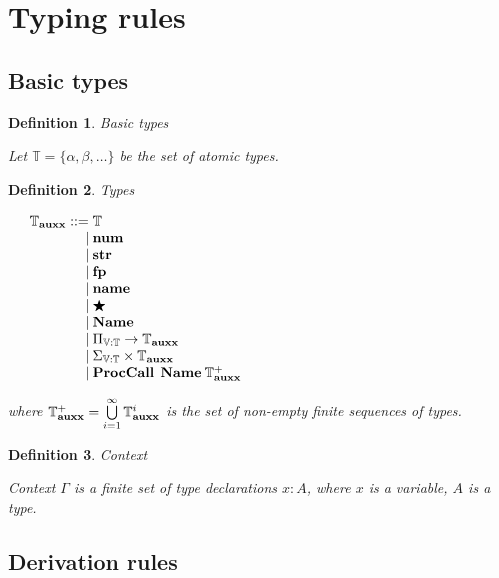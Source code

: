 \documentclass[a4paper]{article}
\newtheorem{defin}{Definition}
\begin{document}
\section{Typing rules}

\subsection{Basic types}

\begin{defin} Basic types

Let $\mathbb{T} = \{ \alpha, \beta, \dots \}$ be the set of atomic types.

\end{defin}

\begin{defin} Types

$\begin{array}{lll}
&\mathbb{T}_{\bf auxx} ::= \mathbb{T}&\\
&\quad\quad\quad\quad | \: {\bf num} &\\
&\quad\quad\quad\quad | \: {\bf str} &\\
&\quad\quad\quad\quad | \: {\bf fp} &\\
&\quad\quad\quad\quad | \: {\bf name} &\\
&\quad\quad\quad\quad | \: \bigstar &\\
&\quad\quad\quad\quad | \: {\bf Name} &\\
&\quad\quad\quad\quad | \: \Pi_{\mathbb{V} : \mathbb{T}} \to \mathbb{T}_{\bf auxx}& \\
&\quad\quad\quad\quad | \: \Sigma_{\mathbb{V} : \mathbb{T}} \times \mathbb{T}_{\bf auxx}& \\
&\quad\quad\quad\quad | \: {\bf ProcCall \:} \: {\bf Name} \: \mathbb{T}_{\bf auxx}^{+}&
\end{array}$

where $\mathbb{T}_{\bf auxx}^{+} = \bigcup \limits_{i = 1}^{\infty} \mathbb{T}_{\bf auxx}^i$ is the set of non-empty finite sequences of types.
\end{defin}

\begin{defin} Context

  Context $\Gamma$ is a finite set of type declarations $x : A$, where $x$ is a variable, $A$ is a type.

\end{defin}

\subsection{Derivation rules}
\end{document}
